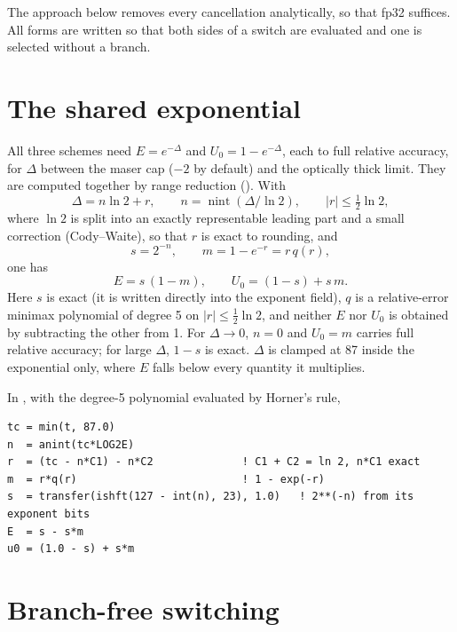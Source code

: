 \documentclass[paper=a4, fontsize=11pt]{scrartcl}
\numberwithin{equation}{section}
\numberwithin{table}{section}
\newcommand{\fort}[1]{\smash{\texttt{#1}}}
\begin{document}
The approach below removes every cancellation analytically, so that fp32
suffices. All forms are written so that both sides of a switch are
evaluated and one is selected without a branch.

\section{The shared exponential}

All three schemes need $E=e^{-\Delta}$ and $U_0=1-e^{-\Delta}$, each to full
relative accuracy, for $\Delta$ between the maser cap ($-2$ by default) and
the optically thick limit. They are computed together by range reduction
(\fort{lw_exp}). With
\begin{equation}
  \Delta = n\ln 2 + r,\qquad n=\operatorname{nint}(\Delta/\ln2),\qquad |r|\le \tfrac12\ln2 ,
\end{equation}
where $\ln2$ is split into an exactly representable leading part and a small
correction (Cody--Waite), so that $r$ is exact to rounding, and
\begin{equation}
  s = 2^{-n},\qquad m = 1-e^{-r} = r\,q(r),
\end{equation}
one has
\begin{equation}
  E = s\,(1-m),\qquad U_0 = (1-s) + s\,m .
  \label{eq:EU0}
\end{equation}
Here $s$ is exact (it is written directly into the exponent field), $q$ is a
relative-error minimax polynomial of degree 5 on $|r|\le\frac12\ln2$, and
neither $E$ nor $U_0$ is obtained by subtracting the other from 1. For
$\Delta\to0$, $n=0$ and $U_0 = m$ carries full relative accuracy; for large
$\Delta$, $1-s$ is exact. $\Delta$ is clamped at 87 inside the exponential
only, where $E$ falls below every quantity it multiplies.

In \fort{lw_exp}, with \fort{q(r)} the degree-5 polynomial evaluated by Horner's
rule,
\begin{verbatim}
tc = min(t, 87.0)
n  = anint(tc*LOG2E)
r  = (tc - n*C1) - n*C2              ! C1 + C2 = ln 2, n*C1 exact
m  = r*q(r)                          ! 1 - exp(-r)
s  = transfer(ishft(127 - int(n), 23), 1.0)   ! 2**(-n) from its exponent bits
E  = s - s*m
u0 = (1.0 - s) + s*m
\end{verbatim}

\section{Branch-free switching}
\end{document}

